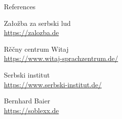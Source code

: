  \begin{block}{References}

\vspace{-5mm}
    \begin{multicols}{2} %
        \begin{thebibliography}{99} 
            Załožba za serbski lud\\
            \url{https://zalozba.de}\\
            \vspace{1mm}
                {}
            \vspace{1mm}
            
            Rěčny centrum Witaj\\
            \url{https://www.witaj-sprachzentrum.de/}\\
            \vspace{1mm}
            \vspace{45mm}

            
            Serbski institut\\
            \url{https://www.serbski-institut.de/}\\
            \vspace{1mm}
            \vspace{1mm}
            
            Bernhard Baier\\
            \url{https://soblexx.de}\\
            \vspace{1mm}
            \vspace{1mm}
            

\end{thebibliography}
\end{multicols}
\end{block}
